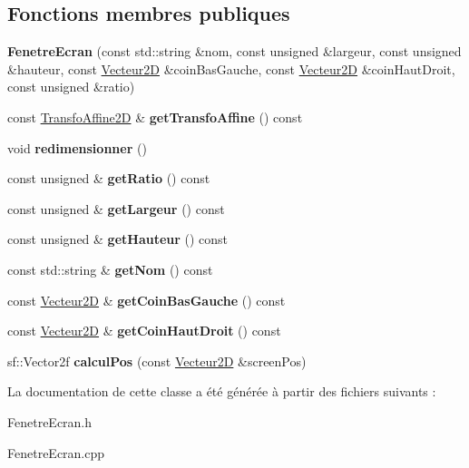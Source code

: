 \subsection*{Fonctions membres publiques}
\begin{DoxyCompactItemize}
\item 
\mbox{\label{class_fenetre_ecran_a47ffd892fcd19b88ee4155c9f8e7bdb6}} 
{\bfseries Fenetre\+Ecran} (const std\+::string \&nom, const unsigned \&largeur, const unsigned \&hauteur, const \mbox{\hyperlink{class_vecteur2_d}{Vecteur2D}} \&coin\+Bas\+Gauche, const \mbox{\hyperlink{class_vecteur2_d}{Vecteur2D}} \&coin\+Haut\+Droit, const unsigned \&ratio)
\item 
\mbox{\label{class_fenetre_ecran_a29ecd8e6c4f773b85b5e344b0ebb67da}} 
const \mbox{\hyperlink{class_transfo_affine2_d}{Transfo\+Affine2D}} \& {\bfseries get\+Transfo\+Affine} () const
\item 
\mbox{\label{class_fenetre_ecran_a7ce7ccc7851d631afd3ac24daed40688}} 
void {\bfseries redimensionner} ()
\item 
\mbox{\label{class_fenetre_ecran_a3a4e5cf7431f2a16530d297a9a3a5ea6}} 
const unsigned \& {\bfseries get\+Ratio} () const
\item 
\mbox{\label{class_fenetre_ecran_aa9424ea54ea0e9296522c53aeba8eb54}} 
const unsigned \& {\bfseries get\+Largeur} () const
\item 
\mbox{\label{class_fenetre_ecran_a39f1bb797e7e8959becdf749e6375eb3}} 
const unsigned \& {\bfseries get\+Hauteur} () const
\item 
\mbox{\label{class_fenetre_ecran_a8f46cab96060e09b4f9ddce25139e362}} 
const std\+::string \& {\bfseries get\+Nom} () const
\item 
\mbox{\label{class_fenetre_ecran_af914092b4e31c40078139552073af215}} 
const \mbox{\hyperlink{class_vecteur2_d}{Vecteur2D}} \& {\bfseries get\+Coin\+Bas\+Gauche} () const
\item 
\mbox{\label{class_fenetre_ecran_a3e19aa107adc34157e5220927232ca4c}} 
const \mbox{\hyperlink{class_vecteur2_d}{Vecteur2D}} \& {\bfseries get\+Coin\+Haut\+Droit} () const
\item 
\mbox{\label{class_fenetre_ecran_a2f4344b4bc71982db1c192ee45548aa1}} 
sf\+::\+Vector2f {\bfseries calcul\+Pos} (const \mbox{\hyperlink{class_vecteur2_d}{Vecteur2D}} \&screen\+Pos)
\end{DoxyCompactItemize}


La documentation de cette classe a été générée à partir des fichiers suivants \+:\begin{DoxyCompactItemize}
\item 
Fenetre\+Ecran.\+h\item 
Fenetre\+Ecran.\+cpp\end{DoxyCompactItemize}
